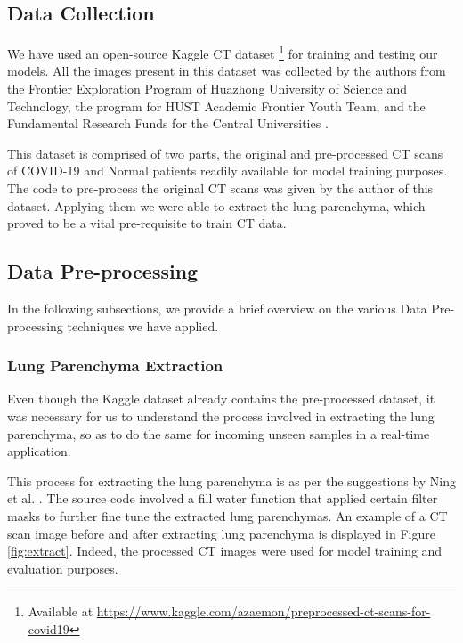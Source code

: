 \subsection{Data Collection}

We have used an open-source Kaggle CT dataset \footnote{Available at \url{https://www.kaggle.com/azaemon/preprocessed-ct-scans-for-covid19}} for training and testing our models. All the images present in this dataset was collected by the authors from the Frontier Exploration Program of Huazhong University of Science and Technology, the program for HUST Academic Frontier Youth Team, and the Fundamental Research Funds for the Central Universities \cite{JCY+2020, ICT2019}. 

This dataset is comprised of two parts, the original and pre-processed CT scans of COVID-19 and Normal patients readily available for model training purposes. The code to pre-process the original CT scans was given by the author of this dataset. Applying them we were able to extract the lung parenchyma, which proved to be a vital pre-requisite to train CT data.

\subsection{Data Pre-processing}

In the following subsections, we provide a brief overview on the various Data Pre-processing techniques we have applied. 
\subsubsection{Lung Parenchyma Extraction}

Even though the Kaggle dataset already contains the pre-processed dataset, it was necessary for us to understand the process involved in extracting the lung parenchyma, so as to do the same for incoming unseen samples in a real-time application.

This process for extracting the lung parenchyma is as per the suggestions by Ning et al. \cite{ICT2019}. The source code involved a fill water function that applied certain filter masks to further fine tune the extracted lung parenchymas. An example of a CT scan image before and after extracting lung parenchyma is displayed in Figure \ref{fig:extract}. Indeed, the processed CT images were used for model training and evaluation purposes.

